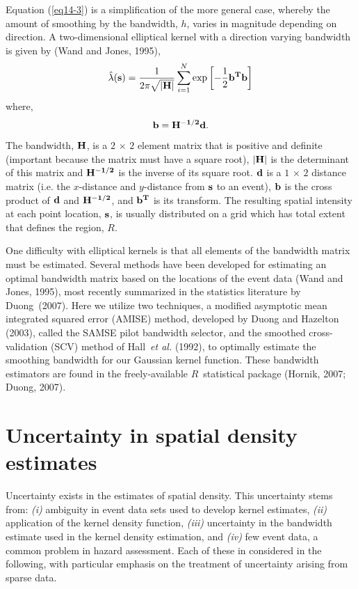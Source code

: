 \documentclass[10pt]{article}
\begin{document}
Equation (\ref{eq14-3}) is a simplification of the more general case, whereby the amount of smoothing by the bandwidth, $h$, varies in magnitude depending on direction. A two-dimensional elliptical kernel with a direction varying bandwidth is given by (Wand and Jones, 1995),
\begin{equation}
\hat\lambda (\mathbf{s}) = \frac{1}{2\pi \sqrt{|\bf{H}|}} \sum^N_{i=1} \exp \left[ -\frac{1}{2}\bf{b}^T \bf{b}\right]
\label{eq14-4}
\end{equation}
where,
\begin{equation}
\bf{b}=H^{-1/2}\bf{d}.
\label{eq14-5}
\end{equation}
The bandwidth, $\bf{H}$, is a $2\,\times\,2$ element matrix  that is positive and definite (important because the matrix must have a square root), $|\bf{H}|$ is the determinant of this matrix and $\bf{H}^{-1/2}$ is the inverse of its square root. $\bf{d}$ is a $1\,\times\,2$ distance matrix (i.e. the $x$-distance and $y$-distance from $\bf{s}$ to an event), $\bf{b}$ is the cross product of $\bf{d}$ and $\bf{H}^{-1/2}$, and $\bf{b}^T$ is its transform. The resulting spatial intensity at each point location, $\bf{s}$, is usually distributed on a grid which has total extent that defines the region, $R$.

One difficulty with elliptical kernels is that all elements of the bandwidth matrix must be estimated. Several methods have been developed for estimating an optimal bandwidth matrix based on the locations of the event data (Wand and Jones, 1995), most recently summarized in the statistics literature by Duong~(2007). Here we utilize two techniques, a modified asymptotic mean integrated squared error (AMISE) method, developed by Duong and Hazelton (2003), called the SAMSE pilot bandwidth  selector, and the smoothed cross-validation (SCV) method of Hall~{\it et al.} (1992), to optimally estimate the smoothing bandwidth for our Gaussian kernel function. These bandwidth estimators are found in the freely-available $R$~statistical package (Hornik, 2007; Duong, 2007). 

\section{Uncertainty in spatial density estimates}
 Uncertainty exists in the estimates of spatial density. This uncertainty stems from: {\it (i)} ambiguity in event data sets used to develop kernel estimates, {\it (ii)} application of the kernel density function, {\it (iii)} uncertainty in the bandwidth estimate used in the kernel density estimation, and {\it (iv)} few event data, a common problem in hazard assessment. Each of these in considered in the following, with particular emphasis on the treatment of uncertainty arising from sparse data.
\end{document}

